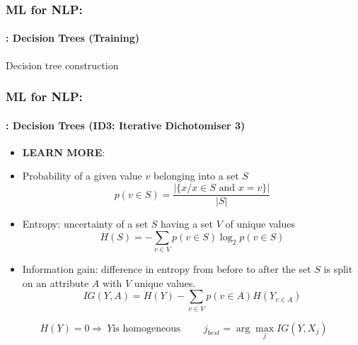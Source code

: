 \documentclass[xcolor=table]{beamer}
\begin{document}
	\begin{frame}
		\frametitle{ML for NLP: \insertsection}
		\framesubtitle{\insertsubsection: Decision Trees (Training)}
	
		\begin{block}{Decision tree construction}
			\scriptsize
			\begin{algorithm}[H]
				
				\Return {}\;
				
				
			\end{algorithm}
		\end{block}
		
	\end{frame}

	\begin{frame}
		\frametitle{ML for NLP: \insertsection}
		\framesubtitle{\insertsubsection: Decision Trees (ID3: Iterative Dichotomiser 3)}
		
		\begin{itemize}
			\item \textbf{LEARN MORE}: \cite{1986-quinlan}
			\item Probability of a given value $ v $ belonging into a set $ S $
			\[p(v\in S) = \frac{|\{x / x\in S \text{ and } x = v\}|}{|S|}\]
			\item Entropy: uncertainty of a set $ S $ having a set $ V $ of unique values
			\[H(S) = - \sum\limits_{v \in V} p(v\in S) \log_2 p(v\in S)\]
			\item Information gain: difference in entropy from before to after the set $ S $ is split on an attribute $ A $ with $ V $ unique values.
			\[IG(Y, A) = H(Y) - \sum_{v \in V} p(v\in A) H(Y_{v\in A})\] 
		\end{itemize}
	
		\[H(Y) = 0 \Rightarrow\ Y \text{is homogeneous} \hspace{1cm} j_{best} = \arg\max_j IG(Y, X_j)\]
		
	\end{frame}
\end{document}
